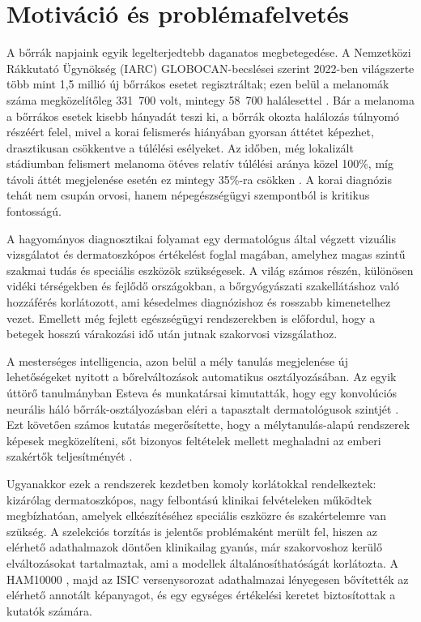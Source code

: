 \section{Motiváció és problémafelvetés}

A bőrrák napjaink egyik legelterjedtebb daganatos megbetegedése. A Nemzetközi
Rákkutató Ügynökség (IARC) GLOBOCAN-becslései szerint 2022-ben világszerte több
mint 1,5 millió új bőrrákos esetet regisztráltak; ezen belül a melanomák száma
megközelítőleg 331~700 volt, mintegy 58~700 halálesettel \cite{iarc2022melanoma}.
Bár a melanoma a bőrrákos esetek kisebb hányadát teszi ki, a bőrrák okozta
halálozás túlnyomó részéért felel, mivel a korai felismerés hiányában gyorsan
áttétet képezhet, drasztikusan csökkentve a túlélési esélyeket. Az időben, még
lokalizált stádiumban felismert melanoma ötéves relatív túlélési aránya közel
100\%, míg távoli áttét megjelenése esetén ez mintegy 35\%-ra csökken
\cite{seer2024melanoma}. A korai diagnózis tehát nem csupán orvosi, hanem
népegészségügyi szempontból is kritikus fontosságú.

A hagyományos diagnosztikai folyamat egy dermatológus által végzett vizuális
vizsgálatot és dermatoszkópos értékelést foglal magában, amelyhez magas szintű
szakmai tudás és speciális eszközök szükségesek. A világ számos részén,
különösen vidéki térségekben és fejlődő országokban, a bőrgyógyászati
szakellátáshoz való
hozzáférés korlátozott, ami késedelmes diagnózishoz és rosszabb kimenetelhez
vezet. Emellett még fejlett egészségügyi rendszerekben is előfordul, hogy a
betegek hosszú várakozási idő után jutnak szakorvosi vizsgálathoz.

A mesterséges intelligencia, azon belül a mély tanulás megjelenése új
lehetőségeket nyitott a bőrelváltozások automatikus osztályozásában. Az egyik
úttörő tanulmányban Esteva és munkatársai kimutatták, hogy egy konvolúciós
neurális háló bőrrák-osztályozásban eléri a tapasztalt dermatológusok szintjét
\cite{esteva2017dermatologist}. Ezt követően számos kutatás megerősítette, hogy a
mélytanulás-alapú rendszerek képesek megközelíteni, sőt bizonyos feltételek
mellett meghaladni az emberi szakértők teljesítményét
\cite{haenssle2018man, brinker2019deep}.

Ugyanakkor ezek a rendszerek kezdetben komoly korlátokkal rendelkeztek: kizárólag
dermatoszkópos, nagy felbontású klinikai felvételeken működtek megbízhatóan,
amelyek elkészítéséhez speciális eszközre és szakértelemre van szükség. A
szelekciós torzítás is jelentős problémaként merült fel, hiszen az elérhető
adathalmazok döntően klinikailag gyanús, már szakorvoshoz kerülő elváltozásokat
tartalmaztak, ami a modellek általánosíthatóságát korlátozta. A HAM10000
\cite{tschandl2019ham10000}, majd az ISIC versenysorozat adathalmazai
\cite{rotemberg2021isic, isic2024} lényegesen bővítették az elérhető annotált
képanyagot, és egy egységes értékelési keretet biztosítottak a kutatók számára.

